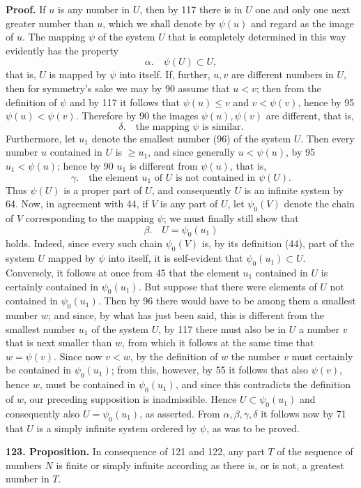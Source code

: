 \documentclass[11pt]{article}
\newcommand{\partof}{\mathrel{\subset}}
\begin{document}
\noindent\textbf{Proof.} If $u$ is any number in $U$, then by 117 there is in $U$ one and only one next greater number than $u$, which we shall denote by $\psi(u)$ and regard as the image of $u$. The mapping $\psi$ of the system $U$ that is completely determined in this way evidently has the property
\[
\alpha.\quad \psi(U)\partof U,
\]
that is, $U$ is mapped by $\psi$ into itself. If, further, $u,v$ are different numbers in $U$, then for symmetry's sake we may by 90 assume that $u<v$; then from the definition of $\psi$ and by 117 it follows that $\psi(u)\leq v$ and $v<\psi(v)$, hence by 95 $\psi(u)<\psi(v)$. Therefore by 90 the images $\psi(u),\psi(v)$ are different, that is,
\[
\delta.\quad \text{the mapping }\psi\text{ is similar.}
\]
Furthermore, let $u_1$ denote the smallest number (96) of the system $U$. Then every number $u$ contained in $U$ is $\geq u_1$, and since generally $u<\psi(u)$, by 95 $u_1<\psi(u)$; hence by 90 $u_1$ is different from $\psi(u)$, that is,
\[
\gamma.\quad \text{the element }u_1\text{ of }U\text{ is not contained in }\psi(U).
\]
Thus $\psi(U)$ is a proper part of $U$, and consequently $U$ is an infinite system by 64. Now, in agreement with 44, if $V$ is any part of $U$, let $\psi_0(V)$ denote the chain of $V$ corresponding to the mapping $\psi$; we must finally still show that
\[
\beta.\quad U=\psi_0(u_1)
\]
holds. Indeed, since every such chain $\psi_0(V)$ is, by its definition (44), part of the system $U$ mapped by $\psi$ into itself, it is self-evident that $\psi_0(u_1)\partof U$. Conversely, it follows at once from 45 that the element $u_1$ contained in $U$ is certainly contained in $\psi_0(u_1)$. But suppose that there were elements of $U$ not contained in $\psi_0(u_1)$. Then by 96 there would have to be among them a smallest number $w$; and since, by what has just been said, this is different from the smallest number $u_1$ of the system $U$, by 117 there must also be in $U$ a number $v$ that is next smaller than $w$, from which it follows at the same time that $w=\psi(v)$. Since now $v<w$, by the definition of $w$ the number $v$ must certainly be contained in $\psi_0(u_1)$; from this, however, by 55 it follows that also $\psi(v)$, hence $w$, must be contained in $\psi_0(u_1)$, and since this contradicts the definition of $w$, our preceding supposition is inadmissible. Hence $U\partof\psi_0(u_1)$ and consequently also $U=\psi_0(u_1)$, as asserted. From $\alpha,\beta,\gamma,\delta$ it follows now by 71 that $U$ is a simply infinite system ordered by $\psi$, as was to be proved.

\noindent\textbf{123. Proposition.} In consequence of 121 and 122, any part $T$ of the sequence of numbers $N$ is finite or simply infinite according as there is, or is not, a greatest number in $T$.
\end{document}
